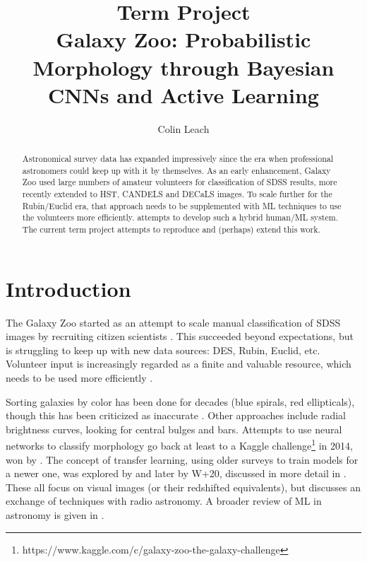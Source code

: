 \documentclass[twocolumn, twocolappendix, tighten]{aastex631}
\begin{document}
\title{Term Project \\Galaxy Zoo: Probabilistic Morphology through Bayesian CNNs and Active Learning}

\author[0000-0003-3608-1546]{Colin Leach}

\begin{abstract}

Astronomical survey data has expanded impressively since the era when professional astronomers could keep up with it by themselves. As an early enhancement, Galaxy Zoo used large numbers of amateur volunteers for classification of SDSS results, more recently extended to HST, CANDELS and DECaLS images. To scale further for the Rubin/Euclid era, that approach needs to be supplemented with ML techniques to use the volunteers more efficiently. \citet{walmsley_galaxy_2020} attempts to develop such a hybrid human/ML system. The current term project attempts to reproduce and (perhaps) extend this work.\\

\end{abstract} 

\section{Introduction} \label{sec:intro}


The Galaxy Zoo started as an attempt to scale manual classification of SDSS images by recruiting citizen scientists \citep{2008MNRAS.389.1179L}. This succeeded beyond expectations, but is struggling to keep up with new data sources: DES, Rubin, Euclid, etc. Volunteer input is increasingly regarded as a finite and valuable resource, which needs to be used more efficiently \citep{2020IAUS..341...99D}.

Sorting galaxies by color has been done for decades (blue spirals, red ellipticals), though this has been criticized as inaccurate \citep{smethurst_quantifying_2022}. Other approaches include radial brightness curves, looking for central bulges and bars. Attempts to use neural networks to classify morphology go back at least to a Kaggle challenge\footnote{https://www.kaggle.com/c/galaxy-zoo-the-galaxy-challenge} in 2014, won by \citet{2015MNRAS.450.1441D}. The concept of transfer learning, using older surveys to train models for a newer one, was explored by \citet{2019MNRAS.484...93D} and later by W+20, discussed in more detail in \citet{2021arXiv211012735W}. These all focus on visual images (or their redshifted equivalents), but \citet{2021arXiv211104353F} discusses an exchange of techniques with radio astronomy. A broader review of ML in astronomy is given in \citet{2020WDMKD..10.1349F}.
\end{document}
